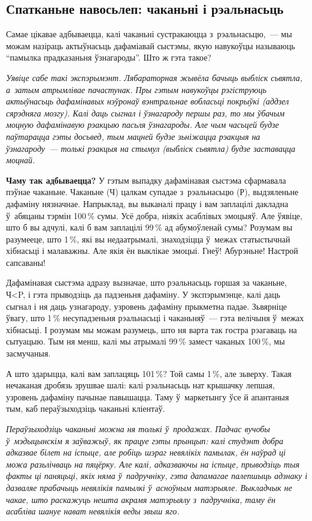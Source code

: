 \subsection*{Спатканьне навосьлеп: чаканьні і рэальнасьць}

Самае цікавае адбываецца, калі чаканьні сустракаюцца з~рэальнасьцю,~--- мы можам назіраць актыўнасьць дафаміавай сыстэмы, якую навукоўцы называюць ``памылка прадказаньня ўзнагароды''. Што ж гэта такое?

\emph{Уявіце сабе такі экспэрымэнт. Лябараторная жывёла бачыць выбліск сьвятла, а~затым атрымлівае пачастунак. Пры гэтым навукоўцы рэгіструюць актыўнасьць дафамінавых нэўронаў вэнтральнае вобласьці покрыўкі (аддзел сярэдняга мозгу). Калі даць сыгнал і ўзнагароду першы раз, то мы ўбачым моцную дафамінавую рэакцыю пасьля ўзнагароды. Але чым часьцей будзе паўтарацца гэты досьвед, тым мацней будзе зьніжацца рэакцыя на ўзнагароду~--- толькі рэакцыя на стымул (выбліск сьвятла) будзе заставацца моцнай.}

\textbf{Чаму так адбываецца?} У гэтым выпадку дафамінавая сыстэма сфармавала пэўнае чаканьне. Чаканьне (Ч) цалкам супадае з~рэальнасьцю (Р), выдзяленьне дафаміну нязначнае. Напрыклад, вы выканалі працу і вам заплацілі дакладна ў~абяцаны тэрмін 100\,\% сумы. Усё добра, ніякіх асаблівых эмоцыяў. Але ўявіце, што б вы адчулі, калі б вам заплацілі 99\,\% ад абумоўленай сумы? Розумам вы разумееце, што 1\,\%, які вы недаатрымалі, знаходзіцца ў~межах статыстычнай хібнасьці і малаважны. Але якія ён выклікае эмоцыі. Гнеў! Абурэньне! Настрой сапсаваны!

Дафамінавая сыстэма адразу вызначае, што рэальнасьць горшая за чаканьне, Ч<P, і гэта прыводзіць да падзеньня дафаміну. У экспэрымэнце, калі даць сыгнал і ня даць узнагароду, узровень дафаміну прыкметна падае. Зьвярніце ўвагу, што 1\,\% несупадзеньня рэальнасьці і чаканьняў~--- гэта велічыня ў~межах хібнасьці. І розумам мы можам разумець, што ня варта так гостра рэагаваць на сытуацыю. Тым ня менш, калі мы атрымалі 99\,\% замест чаканых 100\,\%, мы засмучаныя.

А што здарыцца, калі вам заплацяць 101\,\%? Той самы 1\,\%, але зьверху. Такая нечаканая дробязь зрушвае шалі: калі рэальнасьць нат крышачку лепшая, узровень дафаміну пачынае павышацца. Таму ў~маркетынгу ўсе й апантаныя тым, каб пераўзыходзіць чаканьні кліентаў.

\emph{Пераўзыходзіць чаканьні можна ня толькі ў~продажах. Падчас вучобы ў~мэдыцынскім я заўважыў, як працуе гэты прынцып: калі студэнт добра адказвае білет на іспыце, але робіць шэраг невялікіх памылак, ён наўрад ці можа разьлічваць на пяцёрку. Але калі, адказваючы на іспыце, прыводзіць тыя факты ці паняцьці, якіх няма ў~падручніку, гэта дапамагае палепшыць адзнаку і дазваляе прабачыць невялікія памылкі ў~асноўным матэрыяле. Выкладчык не чакае, што раскажуць нешта акрамя матэрыялу з~падручніка, таму ён асабліва шануе нават невялікія веды звыш яго.}

